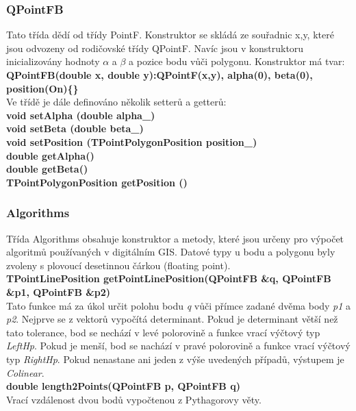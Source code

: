 \documentclass[a4paper,11pt,twoside]{article}
\begin{document}
\newpage
\vspace*{-1cm}
\subsubsection{QPointFB}
Tato třída dědí od třídy PointF. Konstruktor se skládá ze souřadnic x,y, které jsou odvozeny od rodičovské třídy QPointF. Navíc jsou v konstruktoru inicializovány hodnoty $\alpha$ a $\beta$ a pozice bodu vůči polygonu.
\noindent Konstruktor má tvar:\\
\noindent\textbf{QPointFB(double x, double y):QPointF(x,y), alpha(0), beta(0), position(On)\{\}}\\

\noindent Ve třídě je dále definováno několik setterů a getterů:\\
\noindent\textbf{void setAlpha (double alpha\_)}\\
\noindent\textbf{void setBeta (double beta\_)}\\
\noindent\textbf{void setPosition (TPointPolygonPosition position\_)}\\
\noindent\textbf{double getAlpha()}\\
\noindent\textbf{double getBeta()}\\
\noindent\textbf{TPointPolygonPosition getPosition ()}

\subsubsection{Algorithms}
Třída Algorithms obsahuje konstruktor a metody, které jsou určeny pro výpočet algoritmů používaných v digitálním GIS. Datové typy u bodu a polygonu byly zvoleny s plovoucí desetinnou čárkou (floating point).\\

\noindent\textbf{TPointLinePosition getPointLinePosition(QPointFB \&q, QPointFB \&p1, QPointFB \&p2)}\\
Tato funkce má za úkol určit polohu bodu \textit{q} vůči přímce zadané dvěma body \textit{p1} a \textit{p2}.  Nejprve se z vektorů vypočítá determinant. Pokud je determinant větší než tato tolerance, bod se nechází v levé polorovině a funkce vrací výčtový typ \textit{LeftHp}. Pokud je menší, bod se nachází v pravé polorovině a funkce vrací výčtový typ \textit{RightHp}.  Pokud nenastane ani jeden z výše uvedených případů, výstupem je \textit{Colinear}.\\

\noindent\textbf{double length2Points(QPointFB p, QPointFB q)}\\
Vrací vzdálenost dvou bodů vypočtenou z Pythagorovy věty.\\
\end{document}
